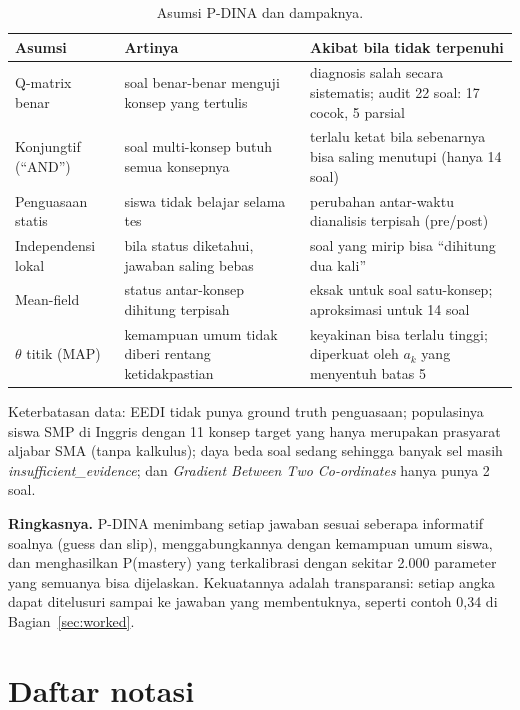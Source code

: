 \documentclass[11pt,a4paper]{article}
\begin{document}
\begin{table}[h]
  \centering\small
  \begin{tabularx}{\linewidth}{@{}l L L@{}}
    \toprule
    Asumsi & Artinya & Akibat bila tidak terpenuhi \\
    \midrule
    Q-matrix benar & soal benar-benar menguji konsep yang tertulis & diagnosis salah secara sistematis; audit 22 soal: 17 cocok, 5 parsial \\
    Konjungtif (``AND'') & soal multi-konsep butuh semua konsepnya & terlalu ketat bila sebenarnya bisa saling menutupi (hanya 14 soal) \\
    Penguasaan statis & siswa tidak belajar selama tes & perubahan antar-waktu dianalisis terpisah (pre/post) \\
    Independensi lokal & bila status diketahui, jawaban saling bebas & soal yang mirip bisa ``dihitung dua kali'' \\
    Mean-field & status antar-konsep dihitung terpisah & eksak untuk soal satu-konsep; aproksimasi untuk 14 soal \\
    $\theta$ titik (MAP) & kemampuan umum tidak diberi rentang ketidakpastian & keyakinan bisa terlalu tinggi; diperkuat oleh $a_k$ yang menyentuh batas 5 \\
    \bottomrule
  \end{tabularx}
  \caption{Asumsi P-DINA dan dampaknya.}
\end{table}

Keterbatasan data: EEDI tidak punya ground truth penguasaan; populasinya siswa SMP di Inggris dengan 11 konsep target
yang hanya merupakan prasyarat aljabar SMA (tanpa kalkulus); daya beda soal sedang sehingga banyak sel masih
\emph{insufficient\_evidence}; dan \emph{Gradient Between Two Co-ordinates} hanya punya 2 soal.

\begin{intinya}
  \textbf{Ringkasnya.} P-DINA menimbang setiap jawaban sesuai seberapa informatif soalnya (guess dan slip),
  menggabungkannya dengan kemampuan umum siswa, dan menghasilkan P(mastery) yang terkalibrasi dengan sekitar 2.000
  parameter yang semuanya bisa dijelaskan. Kekuatannya adalah transparansi: setiap angka dapat ditelusuri sampai ke
  jawaban yang membentuknya, seperti contoh 0,34 di Bagian~\ref{sec:worked}.
\end{intinya}

\appendix
\section{Daftar notasi}
\end{document}
